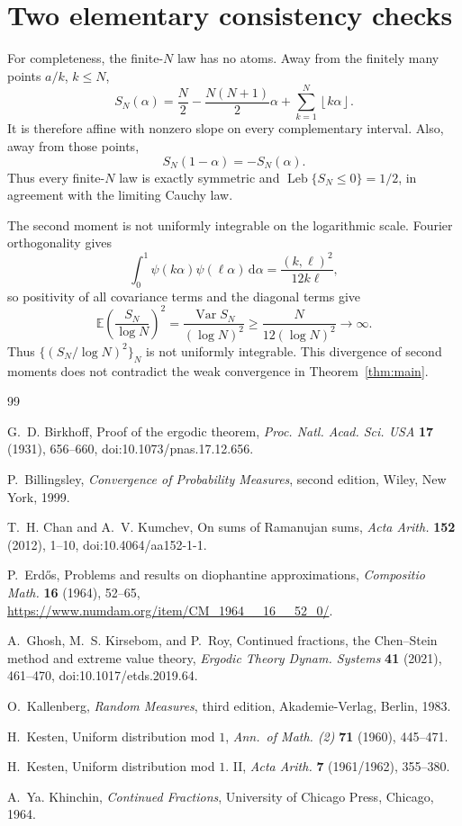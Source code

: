 \documentclass[11pt]{article}
\numberwithin{equation}{section}
\theoremstyle{definition}
\newcommand{\E}{\mathbb E}
\newcommand{\1}{\mathbf 1}
\newcommand{\dd}{\,\mathrm d}
\newcommand{\Var}{\operatorname{Var}}
\newcommand{\Leb}{\operatorname{Leb}}
\newcommand{\floor}[1]{\left\lfloor#1\right\rfloor}
\begin{document}
\section{Two elementary consistency checks}

For completeness, the finite-\(N\) law has no atoms.  Away from the
finitely many points \(a/k\), \(k\le N\),
\[
 S_N(\alpha)=\frac N2-\frac{N(N+1)}2\alpha+
 \sum_{k=1}^N\floor{k\alpha}.
\]
It is therefore affine with nonzero slope on every complementary
interval.  Also, away from those points,
\[
 S_N(1-\alpha)=-S_N(\alpha).
\]
Thus every finite-\(N\) law is exactly symmetric and
\(\Leb\{S_N\le0\}=1/2\), in agreement with the limiting Cauchy law.

The second moment is not uniformly integrable on the logarithmic scale.
Fourier orthogonality gives
\[
 \int_0^1\psi(k\alpha)\psi(\ell\alpha)\dd\alpha
 =\frac{(k,\ell)^2}{12k\ell},
\]
so positivity of all covariance terms and the diagonal terms give
\[
 \E\left(\frac{S_N}{\log N}\right)^2
 =\frac{\Var S_N}{(\log N)^2}
 \ge\frac{N}{12(\log N)^2}\longrightarrow\infty.
\]
Thus \(\{(S_N/\log N)^2\}_N\) is not uniformly integrable.  This
divergence of second moments does not contradict the weak convergence
in Theorem~\ref{thm:main}.

\begin{thebibliography}{99}
\raggedright

G.~D. Birkhoff,
Proof of the ergodic theorem,
\emph{Proc. Natl. Acad. Sci. USA} \textbf{17} (1931), 656--660,
doi:10.1073/pnas.17.12.656.

P.~Billingsley,
\emph{Convergence of Probability Measures}, second edition,
Wiley, New York, 1999.

T.~H. Chan and A.~V. Kumchev,
On sums of Ramanujan sums,
\emph{Acta Arith.} \textbf{152} (2012), 1--10,
doi:10.4064/aa152-1-1.

P.~Erd\H{o}s,
Problems and results on diophantine approximations,
\emph{Compositio Math.} \textbf{16} (1964), 52--65,
\url{https://www.numdam.org/item/CM_1964__16__52_0/}.

A.~Ghosh, M.~S. Kirsebom, and P.~Roy,
Continued fractions, the Chen--Stein method and extreme value theory,
\emph{Ergodic Theory Dynam. Systems} \textbf{41} (2021), 461--470,
doi:10.1017/etds.2019.64.

O.~Kallenberg,
\emph{Random Measures}, third edition,
Akademie-Verlag, Berlin, 1983.

H.~Kesten,
Uniform distribution mod \(1\),
\emph{Ann.\ of Math. (2)} \textbf{71} (1960), 445--471.

H.~Kesten,
Uniform distribution mod \(1\). II,
\emph{Acta Arith.} \textbf{7} (1961/1962), 355--380.

A.~Ya. Khinchin,
\emph{Continued Fractions},
University of Chicago Press, Chicago, 1964.

\end{thebibliography}
\end{document}
